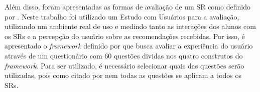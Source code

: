 Além disso, foram apresentadas as formas de avaliação de um SR como definido por . Neste
trabalho foi utilizado um Estudo com Usuários para a avaliação, utilizando um ambiente real de uso e medindo tanto
as interações dos alunos com os SRs e a percepção do usuário sobre as recomendações recebidas. Por isso, é
apresentado o \textit{framework} definido por  que busca avaliar a experiência do usuário através de um
questionário com 60 questões dividas nos quatro construtos do \textit{framework}. Para ser utilizado, é necessário
selecionar quais das questões serão utilizadas, pois como citado por  nem todas as questões se
aplicam a todos os SRs.
